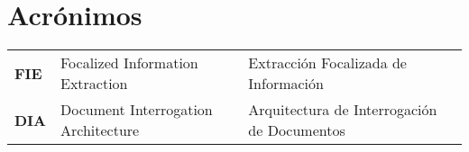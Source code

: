 \chapter*{Acrónimos}

\newcommand{\TERM}[3]{
	\textbf{#1} & #3 & #2 \\[5pt]
}

\begin{longtable}{p{1in}p{2.2in}p{3in}}

		\TERM{FIE}{Extracción Focalizada de Información}{Focalized Information Extraction}
		\TERM{DIA}{Arquitectura de Interrogación de Documentos}{Document Interrogation Architecture}

\end{longtable}

\newpage
